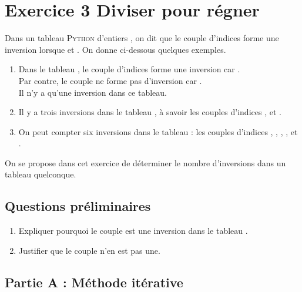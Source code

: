 \documentclass[a4paper,12pt,french]{book}
\begin{document}
\section*{Exercice 3 \small{\hfill Diviser pour régner}}

Dans un tableau \textsc{Python} d'entiers , on dit que le couple d’indices  forme une inversion
lorsque  et . On donne ci-dessous quelques exemples.
\begin{enumerate}[--]
	\item 	Dans le tableau \pythoninline{[1, 5, 3, 7]}, le couple d’indices  forme une inversion car .\\
    Par contre, le couple  ne forme pas d'inversion car .\\
    Il n’y a qu’une inversion dans ce tableau.
	\item  Il y a trois inversions dans le tableau \pythoninline{[1, 6, 2, 7, 3]}, à savoir les couples d'indices
    ,  et .
    \item On peut compter six inversions dans le tableau \pythoninline{[7, 6, 5, 3]} : les couples d'indices
    , , , ,  et .
\end{enumerate}
On se propose dans cet exercice de déterminer le nombre d’inversions dans un tableau
quelconque.

\subsection*{Questions préliminaires}

\begin{enumerate}[\bfseries 1.]
	\item 	Expliquer pourquoi le couple  est une inversion dans le tableau \pythoninline{[4, 8, 3, 7]}.
	\item 	Justifier que le couple  n’en est pas une.
\end{enumerate}
\subsection*{Partie A : Méthode itérative}
\end{document}

